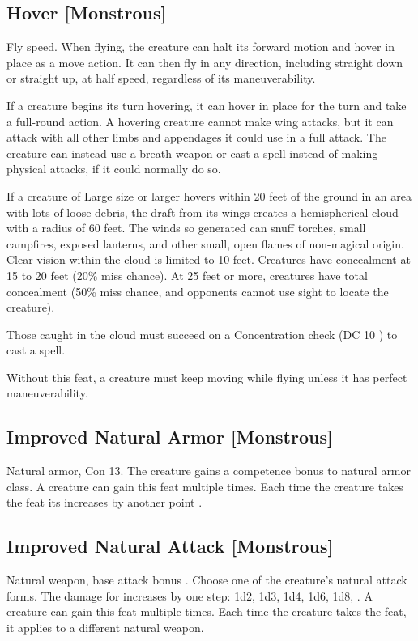 \subsection{Hover [Monstrous]}
 Fly speed.
 When flying, the creature can halt its forward motion and hover in place as a move action. It can then fly in any direction, including straight down or straight up, at half speed, regardless of its maneuverability.

If a creature begins its turn hovering, it can hover in place for the turn and take a full-round action. A hovering creature cannot make wing attacks, but it can attack with all other limbs and appendages it could use in a full attack. The creature can instead use a breath weapon or cast a spell instead of making physical attacks, if it could normally do so.

If a creature of Large size or larger hovers within 20 feet of the ground in an area with lots of loose debris, the draft from its wings creates a hemispherical cloud with a radius of 60 feet. The winds so generated can snuff torches, small campfires, exposed lanterns, and other small, open flames of non-magical origin. Clear vision within the cloud is limited to 10 feet. Creatures have concealment at 15 to 20 feet (20\% miss chance). At 25 feet or more, creatures have total concealment (50\% miss chance, and opponents cannot use sight to locate the creature).

Those caught in the cloud must succeed on a Concentration check (DC 10 \add {} ) to cast a spell.

 Without this feat, a creature must keep moving while flying unless it has perfect maneuverability.

\subsection{Improved Natural Armor [Monstrous]}
 Natural armor, Con 13.
 The creature gains a  competence bonus to natural armor class.
 A creature can gain this feat multiple times. Each time the creature takes the feat its  increases by another point .

\subsection{Improved Natural Attack [Monstrous]}
 Natural weapon, base attack bonus .
 Choose one of the creature's natural attack forms. The damage for  increases by one step: 1d2, 1d3, 1d4, 1d6, 1d8, .
 A creature can gain this feat multiple times. Each time the creature takes the feat, it applies to a different natural weapon.

